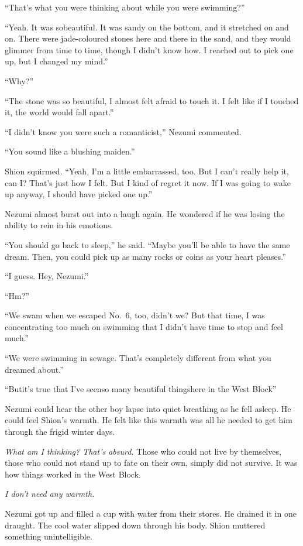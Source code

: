 ``That's what you were thinking about while you were swimming?''

``Yeah. It was so\el beautiful. It was sandy on the bottom, and it
stretched on and on. There were jade-coloured stones here and there in
the sand, and they would glimmer from time to time, though I didn't know
how. I reached out to pick one up, but I changed my mind.''

``Why?''

``The stone was so beautiful, I almost felt afraid to touch it. I felt
like if I touched it, the world would fall apart.''

``I didn't know you were such a romanticist,'' Nezumi commented.

``You sound like a blushing maiden.''

Shion squirmed. ``Yeah, I'm a little embarrassed, too. But I can't
really help it, can I? That's just how I felt. But I kind of regret it
now. If I was going to wake up anyway, I should have picked one up.''

Nezumi almost burst out into a laugh again. He wondered if he was losing
the ability to rein in his emotions.

``You should go back to sleep,'' he said. ``Maybe you'll be able to have
the same dream. Then, you could pick up as many rocks or coins as your
heart pleases.''

``I guess. Hey, Nezumi.''

``Hm?''

``We swam when we escaped No.~6, too, didn't we? But that time, I was
concentrating too much on swimming that I didn't have time to stop and
feel much.''

``We were swimming in sewage. That's completely different from what you
dreamed about.''

``But\el it's true that I've seen\el so many beautiful things\el here in
the West Block\el ''

Nezumi could hear the other boy lapse into quiet breathing as he fell
asleep. He could feel Shion's warmth. He felt like this warmth was all
he needed to get him through the frigid winter days.

\emph{What am I thinking? That's absurd.} Those who could not live by
themselves, those who could not stand up to fate on their own, simply
did not survive. It was how things worked in the West Block.

\emph{I don't need any warmth.}

Nezumi got up and filled a cup with water from their stores. He drained
it in one draught. The cool water slipped down through his body. Shion
muttered something unintelligible.

